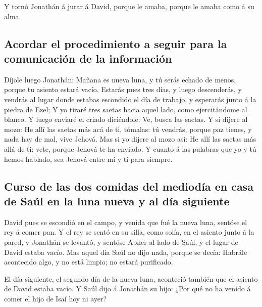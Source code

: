  Y tornó Jonathán á jurar á David, porque le amaba, porque
le amaba como á su alma.

\hypertarget{acordar-el-procedimiento-a-seguir-para-la-comunicaciuxf3n-de-la-informaciuxf3n}{%
\subsection{Acordar el procedimiento a seguir para la comunicación de la
información}\label{acordar-el-procedimiento-a-seguir-para-la-comunicaciuxf3n-de-la-informaciuxf3n}}

 Díjole luego Jonathán: Mañana es nueva luna, y tú serás
echado de menos, porque tu asiento estará vacío.  Estarás
pues tres días, y luego descenderás, y vendrás al lugar donde estabas
escondido el día de trabajo, y esperarás junto á la piedra de Ezel;
 Y yo tiraré tres saetas hacia aquel lado, como
ejercitándome al blanco.  Y luego enviaré el criado
diciéndole: Ve, busca las saetas. Y si dijere al mozo: He allí las
saetas más acá de ti, tómalas: tú vendrás, porque paz tienes, y nada hay
de mal, vive Jehová.  Mas si yo dijere al mozo así: He allí
las saetas más allá de ti: vete, porque Jehová te ha enviado.
 Y cuanto á las palabras que yo y tú hemos hablado, sea
Jehová entre mí y ti para siempre.

\hypertarget{curso-de-las-dos-comidas-del-medioduxeda-en-casa-de-sauxfal-en-la-luna-nueva-y-al-duxeda-siguiente}{%
\subsection{Curso de las dos comidas del mediodía en casa de Saúl en la
luna nueva y al día
siguiente}\label{curso-de-las-dos-comidas-del-medioduxeda-en-casa-de-sauxfal-en-la-luna-nueva-y-al-duxeda-siguiente}}

 David pues se escondió en el campo, y venida que fué la
nueva luna, sentóse el rey á comer pan.  Y el rey se sentó
en su silla, como solía, en el asiento junto á la pared, y Jonathán se
levantó, y sentóse Abner al lado de Saúl, y el lugar de David estaba
vacío.  Mas aquel día Saúl no dijo nada, porque se decía:
Habrále acontecido algo, y no está limpio; no estará purificado.

 El día siguiente, el segundo día de la nueva luna,
aconteció también que el asiento de David estaba vacío. Y Saúl dijo á
Jonathán su hijo: ¿Por qué no ha venido á comer el hijo de Isaí hoy ni
ayer?

